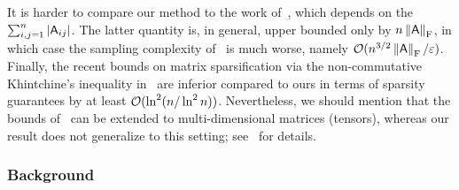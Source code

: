 %
It is harder to compare our method to the work of~\cite{matrix:sparsification:arora}, which depends on the $\sum_{i,j=1}^n \left|{\mathsf{A} }_{ij}\right|$. The latter quantity is, in general, upper bounded only by $n \left\|{\mathsf{A} }\right\|_{\textrm{F}}$, in which case the sampling complexity of~\cite{matrix:sparsification:arora} is much worse, namely $\mathcal{O}(n^{3/2}\left\|{\mathsf{A} }\right\|_{\textrm{F}}/\varepsilon)$.
%
%
Finally, the recent bounds on matrix sparsification via the non-commutative Khintchine's inequality in~\cite{drineas:sparsification_via_khintchine} are inferior compared to ours in terms of sparsity guarantees by at least $\mathcal{O}(\ln^2 ( n /\ln^2 n))$. Nevertheless, we should mention that the bounds of~\cite{drineas:sparsification_via_khintchine} can be extended to multi-dimensional matrices (tensors), whereas our result does not generalize to this setting; see~\cite{drineas:tensor_sparsification} for details.
%
%
\subsubsection{Background}
%
